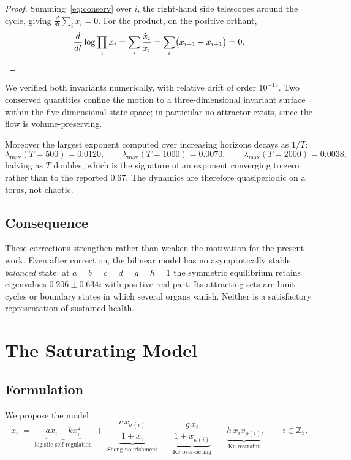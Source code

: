 \documentclass[11pt]{article}
\newcommand{\Z}{{\mathbb{Z}}}
\begin{document}
\begin{proof}
Summing~\eqref{eq:conserv} over $i$, the right-hand side telescopes around the
cycle, giving $\frac{d}{dt}\sum_i x_i=0$. For the product, on the positive
orthant,
\[
\frac{d}{dt}\log\prod_i x_i=\sum_i\frac{\dot x_i}{x_i}
=\sum_i\bigl(x_{i-1}-x_{i+1}\bigr)=0 . \qedhere
\]
\end{proof}

We verified both invariants numerically, with relative drift of order
$10^{-15}$. Two conserved quantities confine the motion to a three-dimensional
invariant surface within the five-dimensional state space; in particular no
attractor exists, since the flow is volume-preserving.

Moreover the largest exponent computed over increasing horizons decays as
$1/T$:
\[
\lambda_{\max}(T{=}500)=0.0120,\qquad
\lambda_{\max}(T{=}1000)=0.0070,\qquad
\lambda_{\max}(T{=}2000)=0.0038,
\]
halving as $T$ doubles, which is the signature of an exponent converging to zero
rather than to the reported $0.67$. The dynamics are therefore quasiperiodic on
a torus, not chaotic.

\subsection{Consequence}

These corrections strengthen rather than weaken the motivation for the present
work. Even after correction, the bilinear model has no asymptotically stable
\emph{balanced} state: at $a=b=c=d=g=h=1$ the symmetric equilibrium retains
eigenvalues $0.206\pm0.634i$ with positive real part. Its attracting sets are
limit cycles or boundary states in which several organs vanish. Neither is a
satisfactory representation of sustained health.
\section{The Saturating Model}\label{sec:model}

\subsection{Formulation}

We propose the model
\begin{equation}\label{eq:sat}
\dot{x}_i \;=\;
\underbrace{a x_i - k x_i^2}_{\text{logistic self-regulation}}
\;+\;\underbrace{\frac{c\,x_{\sigma(i)}}{1+x_i}}_{\text{Sheng nourishment}}
\;-\;\underbrace{\frac{g\,x_i}{1+x_{\kappa(i)}}}_{\text{Ke over-acting}}
\;-\;\underbrace{h\,x_i x_{\rho(i)}}_{\text{Ke restraint}},
\qquad i\in\Z_5 .
\end{equation}
\end{document}

